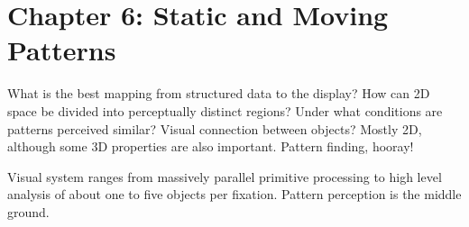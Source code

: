 \section{Chapter 6: Static and Moving Patterns}
\graphicspath{ {pngs/ch6/} }

\secttoc

What is the best mapping from structured data to the display?
How can 2D space be divided into perceptually distinct regions?
Under what conditions are patterns perceived similar?
Visual connection between objects?
Mostly 2D, although some 3D properties are also important.
Pattern finding, hooray!


Visual system ranges from massively parallel primitive processing to high level
analysis of about one to five objects per fixation. Pattern perception is the
middle ground.


